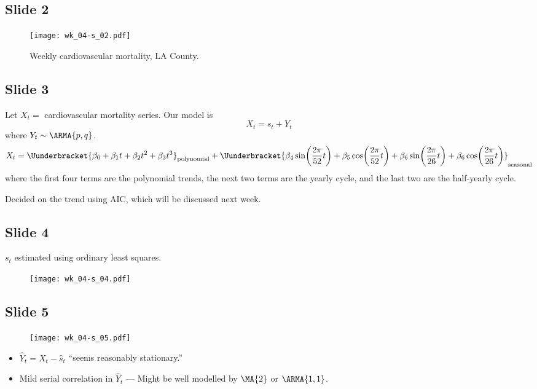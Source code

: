 \subsection*{Slide 2}
\begin{figure}[H]
    \centering
    \texttt{[image: wk\_04-s\_02.pdf]}
    \caption{Weekly cardiovascular mortality, LA County.}
\end{figure}

\subsection*{Slide 3}
Let $ X_t= $ cardiovascular mortality series. Our model is
\[ X_t=s_t+Y_t \]
where $ Y_t \sim \ARMA{p,q} $.
\[ X_t=
    \Uunderbracket{\beta_0+\beta_1 t+\beta_2 t^2+\beta_3 t^3}_{\text{polynomial}}
    +\Uunderbracket{\beta_4\sin\biggl(\frac{2\pi}{52}t \biggr)
        +\beta_5\cos\biggl(\frac{2\pi}{52}t \biggr)+\beta_6\sin\biggl(\frac{2\pi}{26}t \biggr)
        +\beta_6\cos\biggl(\frac{2\pi}{26}t \biggr)}_{\text{seasonal}} \]
where the first four terms are the polynomial trends, the next two terms
are the yearly cycle, and the last two are the half-yearly cycle.

Decided on the trend using AIC, which will be discussed next week.

\subsection*{Slide 4}
$ s_t $ estimated using ordinary least squares.
\begin{figure}[H]
    \centering
    \texttt{[image: wk\_04-s\_04.pdf]}
\end{figure}

\subsection*{Slide 5}
\begin{figure}[H]
    \centering
    \texttt{[image: wk\_04-s\_05.pdf]}
\end{figure}
\begin{itemize}
    \item $ \hat{Y}_t=X_t-\hat{s}_t $ ``seems reasonably
          stationary.''
    \item Mild serial correlation in $ \hat{Y}_t $ --- Might be well modelled by $ \MA{2} $ or $ \ARMA{1,1} $.
\end{itemize}


